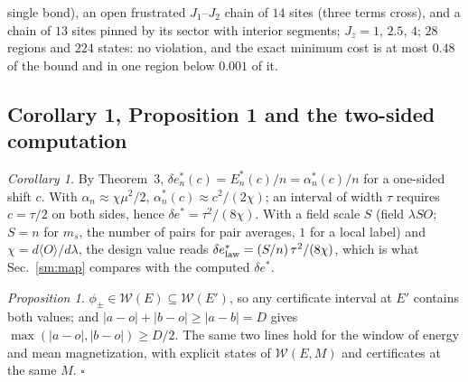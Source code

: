 \documentclass[aps,prx,onecolumn,10pt,nofootinbib,longbibliography,floatfix]{revtex4-2}
\theoremstyle{remark}
\newcommand{\Jz}{J_z}
\newcommand{\ms}{m_s}
\newcommand{\des}{\delta e^{*}}
\newcommand{\W}{\mathcal{W}}
\begin{document}
single bond), an open frustrated $J_1$--$J_2$ chain of $14$ sites (three terms cross), and a chain of $13$ sites %
pinned by its sector with interior segments; $\Jz=1$, $2.5$, $4$; $28$ regions and $224$ states: no violation, %
and the exact minimum cost is at most $0.48$ of the bound and in one region below $0.001$ of it. %

\subsection{Corollary 1, Proposition 1 and the two-sided computation} %
\emph{Corollary 1.} By Theorem~3, $\des_n(c)=E^*_n(c)/n=\alpha^*_n(c)/n$ for a one-sided shift $c$. With %
$\alpha_n\approx\chi\mu^2/2$, $\alpha_n^*(c)\approx c^2/(2\chi)$; an interval of width $\tau$ requires $c=\tau/2$ on %
both sides, hence $\des=\tau^2/(8\chi)$. With a field scale $S$ (field $\lambda SO$; $S=n$ for $\ms$, the number of %
pairs for pair averages, $1$ for a local label) and $\chi=d\langle O\rangle/d\lambda$, the design value reads %
$\des_{\rm law}=(S/n)\,\tau^2/(8\chi)$, which is what Sec.~\ref{sm:map} compares with the computed $\des$. %

\emph{Proposition 1.} $\phi_\pm\in\W(E)\subseteq\W(E')$, so any certificate interval at $E'$ contains both values; %
and $|a-o|+|b-o|\ge|a-b|=D$ gives $\max(|a-o|,|b-o|)\ge D/2$. The same two lines hold for the window of energy and %
mean magnetization, with explicit states of $\W(E,M)$ and certificates at the same $M$. \hfill$\square$
\end{document}
